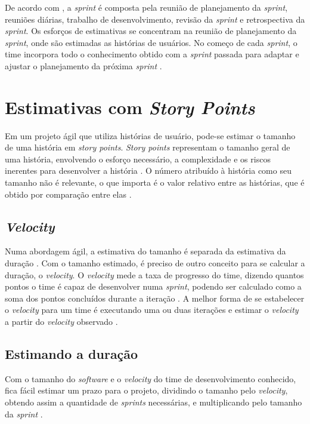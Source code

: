  De acordo com , a
 \textit{sprint} é composta pela reunião de planejamento da \textit{sprint}, reuniões diárias, trabalho de desenvolvimento,
 revisão da \textit{sprint} e retrospectiva da \textit{sprint}. Os esforços de estimativas se concentram na reunião de
 planejamento da \textit{sprint}, onde são estimadas as histórias de usuários. No começo de cada \textit{sprint}, o time
 incorpora todo o conhecimento obtido com a \textit{sprint} passada para adaptar e ajustar o planejamento da próxima
 \textit{sprint} \cite{cohn06}.

\section{Estimativas com \textit{Story Points}}

 Em um projeto ágil
 que utiliza histórias de usuário, pode-se estimar o tamanho de uma história em \textit{story points}.
 \textit{Story points} representam o tamanho geral de uma história, envolvendo o esforço necessário, a complexidade e os
 riscos inerentes para desenvolver a história \cite{cohn06}. O número atribuído à história como seu tamanho não é relevante,
 o que importa é o valor relativo entre as histórias, que é obtido por comparação entre elas \cite{cohn06}.

  \subsection{\textit{Velocity}}

    Numa abordagem ágil, a estimativa do tamanho é separada da estimativa da duração \cite{cohn06}.
    Com o tamanho estimado, é preciso de outro conceito para se calcular a duração, o \textit{velocity}.
    O \textit{velocity} mede a taxa de progresso do time, dizendo quantos pontos o time é capaz de desenvolver
    numa \textit{sprint}, podendo ser calculado como a soma dos pontos concluídos durante a iteração \cite{cohn06}.
    A melhor forma de se estabelecer o \textit{velocity} para um time é executando uma ou duas iterações e estimar o
    \textit{velocity} a partir do \textit{velocity} observado \cite{cohn06}.

  \subsection{Estimando a duração}

    Com o tamanho do \textit{software} e o \textit{velocity} do time de desenvolvimento conhecido, fica fácil estimar
    um prazo para o projeto, dividindo o tamanho pelo \textit{velocity}, obtendo assim a quantidade de \textit{sprints}
    necessárias, e multiplicando pelo tamanho da \textit{sprint} \cite{cohn06}.

